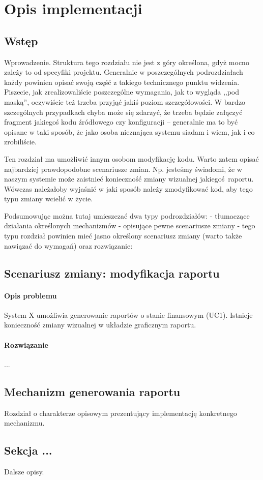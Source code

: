 \chapter{Opis implementacji}
\label{Chapter6}

\section{Wstęp}
\label{Chapter61}

Wprowadzenie. Struktura tego rozdziału nie jest z góry określona, gdyż mocno zależy to od specyfiki projektu. Generalnie w poszczególnych podrozdziałach każdy powinien opisać swoją część z takiego technicznego punktu widzenia. Piszecie, jak zrealizowaliście poszczególne wymagania, jak to wygląda ,,pod maską'', oczywiście też trzeba przyjąć jakiś poziom szczegółowości. W bardzo szczególnych przypadkach chyba może się zdarzyć, że trzeba będzie załączyć fragment jakiegoś kodu źródłowego czy konfiguracji -- generalnie ma to być opisane w taki sposób, że jako osoba nieznająca systemu siadam i wiem, jak i co zrobiliście. 

Ten rozdział ma umożliwić innym osobom modyfikację kodu. Warto zatem opisać najbardziej prawdopodobne scenariusze zmian. Np. jesteśmy świadomi, że w naszym systemie może zaistnieć konieczność zmiany wizualnej jakiegoś raportu. Wówczas należałoby wyjaśnić w jaki sposób należy zmodyfikować kod, aby tego typu zmiany wcielić w życie. 

Podsumowując można tutaj umieszczać dwa typy podrozdziałów:
- tłumaczące działania określonych mechanizmów
- opisujące pewne scenariusze zmiany - tego typu rozdział powinien mieć jasno określony scenariusz zmiany (warto także nawiązać do wymagań) oraz rozwiązanie:


\section{Scenariusz zmiany: modyfikacja raportu}
\label{Chapter62}

\subsubsection{Opis problemu}
System X umożliwia generowanie raportów o stanie finansowym (UC1). Istnieje konieczność zmiany wizualnej w układzie graficznym raportu.

\subsubsection{Rozwiązanie}
...

\section{Mechanizm generowania raportu}
\label{Chapter63}

Rozdział o charakterze opisowym prezentujący implementację konkretnego mechanizmu.

\section{Sekcja ...}
\label{Chapter64}

Dalsze opisy.